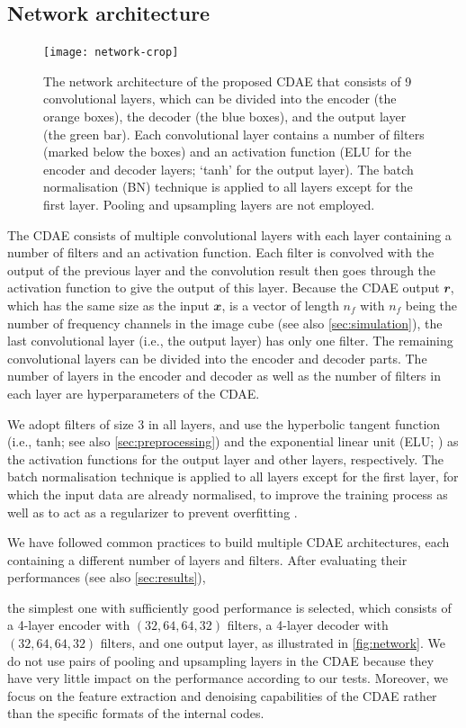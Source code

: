 \documentclass[fleqn,usenatbib]{mnras}
\newcommand{\B}[1]{\mathbfit{#1}}
\newcommand{\editwip}[1]{{\leavevmode\color{magenta}#1}}
\begin{document}
\subsection{Network architecture}
\label{sec:architecture}

\begin{figure}
  \centering
  \texttt{[image: network-crop]}
  \caption{\label{fig:network}\editwip{%
    The network architecture of the proposed CDAE that consists of 9
    convolutional layers, which can be divided into the encoder (the orange
    boxes), the decoder (the blue boxes), and the output layer (the green
    bar).
    Each convolutional layer contains a number of filters (marked below the
    boxes) and an activation function (ELU for the encoder and decoder
    layers; `tanh' for the output layer).
    The batch normalisation (BN) technique is applied to all layers except
    for the first layer.
    Pooling and upsampling layers are not employed.
  }}
\end{figure}

\editwip{%
The CDAE consists of multiple convolutional layers with each layer
containing a number of filters and an activation function.
Each filter is convolved with the output of the previous layer and the
convolution result then goes through the activation function to give
the output of this layer.
Because the CDAE output $\B{r}$, which has the same size as the input
$\B{x}$, is a vector of length $n_f$ with $n_f$ being the number of
frequency channels in the image cube (see also \autoref{sec:simulation}),
the last convolutional layer (i.e., the output layer) has only one filter.
The remaining convolutional layers can be divided into the encoder and
decoder parts.
The number of layers in the encoder and decoder as well as the number of
filters in each layer are hyperparameters of the CDAE.

We adopt filters of size 3 in all layers, and use the hyperbolic tangent
function (i.e., tanh; see also \autoref{sec:preprocessing}) and the
exponential linear unit (ELU; \citealt{clevert2016}) as the activation
functions for the output layer and other layers, respectively.
The batch normalisation technique is applied to all layers except for the
first layer, for which the input data are already normalised, to improve
the training process as well as to act as a regularizer to prevent
overfitting \citep{ioffe2015}.

We have followed common practices \citep[e.g.,][]{suganuma2018,geron2017}
to build multiple CDAE architectures, each containing a different number of
layers and filters.
After evaluating their performances (see also \autoref{sec:results}),} %
the simplest one with sufficiently good performance is selected,
which consists of a 4-layer encoder with $(32,64,64,32)$ filters,
a 4-layer decoder with $(32,64,64,32)$ filters, and one output layer,
as illustrated in \autoref{fig:network}.
\editwip{%
We do not use pairs of pooling and upsampling layers in the CDAE because
they have very little impact on the performance according to our tests.
Moreover, we focus on the feature extraction and denoising capabilities of
the CDAE rather than the specific formats of the internal codes.} %
\end{document}
